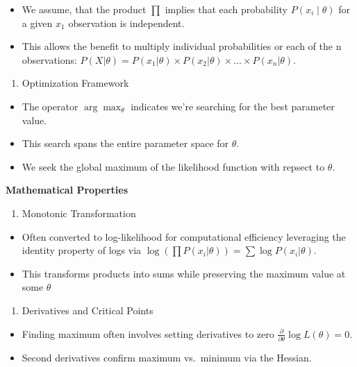 \documentclass[
  12 pt,
  a4paper,
]{book}
\providecommand{\tightlist}{%
  \setlength{\itemsep}{0pt}\setlength{\parskip}{0pt}}
\numberwithin{equation}{section}
\theoremstyle{plain}      %
\theoremstyle{definition} %
\theoremstyle{remark}     %
\theoremstyle{note}         %
\begin{document}
\begin{itemize}
\tightlist
\item
  We assume, that the product \(\prod\) implies that each probability
  \(P(x_i\! \mid\! \theta)\) for a given \(x_1\) observation is
  independent.
\item
  This allows the benefit to multiply individual probabilities or each
  of the n observations:
  \(P(X|\theta) = P(x_1|\theta) \times P(x_2|\theta) \times ... \times P(x_n|\theta)\).
\end{itemize}

\begin{enumerate}
\def\labelenumi{\arabic{enumi}.}
\setcounter{enumi}{2}
\tightlist
\item
  Optimization Framework
\end{enumerate}

\begin{itemize}
\tightlist
\item
  The operator \(\arg\max_{\theta}\) indicates we're searching for the
  best parameter value.
\item
  This search spans the entire parameter space for \(\theta\).
\item
  We seek the global maximum of the likelihood function with repsect to
  \(\theta\).
\end{itemize}

\textbf{Mathematical Properties}

\begin{enumerate}
\def\labelenumi{\arabic{enumi}.}
\tightlist
\item
  Monotonic Transformation
\end{enumerate}

\begin{itemize}
\tightlist
\item
  Often converted to log-likelihood for computational efficiency
  leveraging the identity property of logs via
  \(\log(\prod P(x_i|\theta)) = \sum \log P(x_i|\theta)\).
\item
  This transforms products into sums while preserving the maximum value
  at some \(\theta\)
\end{itemize}

\begin{enumerate}
\def\labelenumi{\arabic{enumi}.}
\setcounter{enumi}{1}
\tightlist
\item
  Derivatives and Critical Points
\end{enumerate}

\begin{itemize}
\tightlist
\item
  Finding maximum often involves setting derivatives to zero
  \(\frac{\partial}{\partial \theta} \log L(\theta) = 0\).
\item
  Second derivatives confirm maximum vs.~minimum via the Hessian.
\end{itemize}
\end{document}
